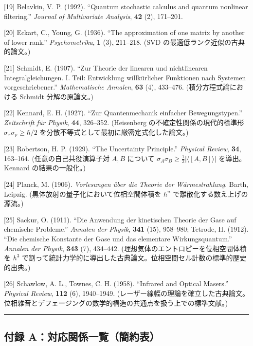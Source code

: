 \documentclass[
]{ltjsarticle}
\begin{document}
{[}19{]} Belavkin, V. P. (1992). ``Quantum stochastic calculus and
quantum nonlinear filtering.'' \emph{Journal of Multivariate Analysis},
\textbf{42} (2), 171--201.

{[}20{]} Eckart, C., Young, G. (1936). ``The approximation of one matrix
by another of lower rank.'' \emph{Psychometrika}, \textbf{1} (3),
211--218. (SVD の最適低ランク近似の古典的論文。)

{[}21{]} Schmidt, E. (1907). ``Zur Theorie der linearen und
nichtlinearen Integralgleichungen. I. Teil: Entwicklung willkürlicher
Funktionen nach Systemen vorgeschriebener.'' \emph{Mathematische
Annalen}, \textbf{63} (4), 433--476. (積分方程式論における Schmidt
分解の原論文。)

{[}22{]} Kennard, E. H. (1927). ``Zur Quantenmechanik einfacher
Bewegungstypen.'' \emph{Zeitschrift für Physik}, \textbf{44}, 326--352.
(Heisenberg の不確定性関係の現代的標準形
\(\sigma_x \sigma_p \geq \hbar/2\)
を分散不等式として最初に厳密定式化した論文。)

{[}23{]} Robertson, H. P. (1929). ``The Uncertainty Principle.''
\emph{Physical Review}, \textbf{34}, 163--164. (任意の自己共役演算子対
\(A, B\) について
\(\sigma_A \sigma_B \geq \frac{1}{2}|\langle[A,B]\rangle|\)
を導出。Kennard の結果の一般化。)

{[}24{]} Planck, M. (1906). \emph{Vorlesungen über die Theorie der
Wärmestrahlung}. Barth, Leipzig. (黒体放射の量子化において位相空間体積を
\(h^n\) で離散化する数え上げの源流。)

{[}25{]} Sackur, O. (1911). ``Die Anwendung der kinetischen Theorie der
Gase auf chemische Probleme.'' \emph{Annalen der Physik}, \textbf{341}
(15), 958--980; Tetrode, H. (1912). ``Die chemische Konstante der Gase
und das elementare Wirkungsquantum.'' \emph{Annalen der Physik},
\textbf{343} (7), 434--442. (理想気体のエントロピーを位相空間体積を
\(h^3\)
で割って統計力学的に導出した古典論文。位相空間セル計数の標準的歴史的出典。)

{[}26{]} Schawlow, A. L., Townes, C. H. (1958). ``Infrared and Optical
Masers.'' \emph{Physical Review}, \textbf{112} (6), 1940--1949.
(レーザー線幅の理論を確立した古典論文。位相雑音とデフェージングの数学的構造の共通点を扱う上での標準文献。)

\begin{center}\rule{0.5\linewidth}{0.5pt}\end{center}

\subsection{付録
A：対応関係一覧（簡約表）}\label{ux4ed8ux9332-aux5bfeux5fdcux95a2ux4fc2ux4e00ux89a7ux7c21ux7d04ux8868}
\end{document}
